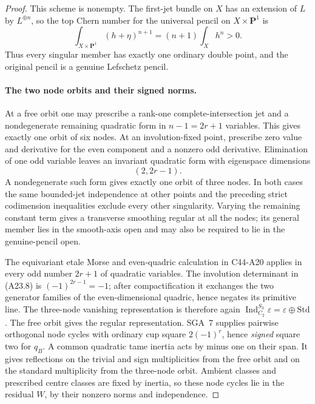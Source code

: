 \documentclass[11pt]{article}
\theoremstyle{remark}\newtheorem{remark}[theorem]{Remark}
\begin{document}
\begin{proof}
This scheme is nonempty.  The first-jet bundle on $X$ has an extension
of $L$ by $L^{\oplus n}$, so the top Chern number for the universal
pencil on $X\times\mathbf P^1$ is
\[
 \int_{X\times\mathbf P^1}(h+\eta)^{n+1}
                =(n+1)\int_Xh^n>0.
 \tag{A23.7}
\]
Thus every singular member has exactly one ordinary double point,
and the original pencil is a genuine Lefschetz pencil.

\paragraph{The two node orbits and their signed norms.}
At a free orbit one may prescribe a rank-one complete-intersection
jet and a nondegenerate remaining quadratic form in $n-1=2r+1$
variables.  This gives exactly one orbit of six nodes.  At an
involution-fixed point, prescribe zero value and derivative for the
even component and a nonzero odd derivative.  Elimination of one odd
variable leaves an invariant quadratic form with eigenspace dimensions
\[
                              (2,2r-1).
 \tag{A23.8}
\]
A nondegenerate such form gives exactly one orbit of three nodes.
In both cases the same bounded-jet independence at other points and
the preceding strict codimension inequalities exclude every other
singularity.  Varying the remaining constant term gives a transverse
smoothing regular at all the nodes; its general member lies in the
smooth-axis open and may also be required to lie in the genuine-pencil
open.

The equivariant etale Morse and even-quadric calculation in C44-A20
applies in every odd number $2r+1$ of quadratic variables.  The
involution determinant in (A23.8) is $(-1)^{2r-1}=-1$; after
compactification it exchanges the two generator families of the
even-dimensional quadric, hence negates its primitive line.  The
three-node vanishing representation is therefore again
$\operatorname{Ind}_{C_2}^{S_3}\varepsilon=\varepsilon\oplus\mathrm{Std}$.
The free orbit gives the regular representation.  SGA~7 supplies
pairwise orthogonal node cycles with ordinary cup square
$2(-1)^r$, hence \emph{signed} square two for $q_B$.  A common quadratic
tame inertia acts by minus one on their span.  It gives reflections
on the trivial and sign multiplicities from the free orbit and on the
standard multiplicity from the three-node orbit.  Ambient classes and
prescribed centre classes are fixed by inertia, so these node cycles
lie in the residual $W$, by their nonzero norms and independence.


\end{proof}
\end{document}
